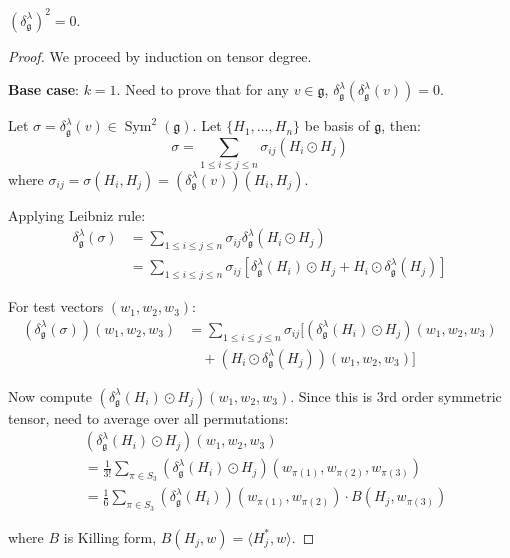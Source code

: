 \documentclass[10pt,a4paper]{amsart}
\begin{document}
\begin{theorem}[Nilpotency]
\label{thm:nilpotency}
$(\delta^\lambda_\mathfrak{g})^2 = 0$.
\end{theorem}

\begin{proof}
We proceed by induction on tensor degree.

\textbf{Base case}: $k=1$. Need to prove that for any $v \in \mathfrak{g}$, $\delta^\lambda_\mathfrak{g}(\delta^\lambda_\mathfrak{g}(v)) = 0$.

Let $\sigma = \delta^\lambda_\mathfrak{g}(v) \in \operatorname{Sym}^2(\mathfrak{g})$. Let $\{H_1, \ldots, H_n\}$ be basis of $\mathfrak{g}$, then:
$$\sigma = \sum_{1 \leq i \leq j \leq n} \sigma_{ij} (H_i \odot H_j)$$
where $\sigma_{ij} = \sigma(H_i, H_j) = (\delta^\lambda_\mathfrak{g}(v))(H_i, H_j)$.

Applying Leibniz rule:
\begin{align}
\delta^\lambda_\mathfrak{g}(\sigma) &= \sum_{1 \leq i \leq j \leq n} \sigma_{ij} \delta^\lambda_\mathfrak{g}(H_i \odot H_j) \\
&= \sum_{1 \leq i \leq j \leq n} \sigma_{ij} [\delta^\lambda_\mathfrak{g}(H_i) \odot H_j + H_i \odot \delta^\lambda_\mathfrak{g}(H_j)]
\end{align}

For test vectors $(w_1, w_2, w_3)$:
\begin{align}
(\delta^\lambda_\mathfrak{g}(\sigma))(w_1, w_2, w_3) &= \sum_{1 \leq i \leq j \leq n} \sigma_{ij} [(\delta^\lambda_\mathfrak{g}(H_i) \odot H_j)(w_1, w_2, w_3) \\
&\quad + (H_i \odot \delta^\lambda_\mathfrak{g}(H_j))(w_1, w_2, w_3)]
\end{align}

Now compute $(\delta^\lambda_\mathfrak{g}(H_i) \odot H_j)(w_1, w_2, w_3)$. Since this is 3rd order symmetric tensor, need to average over all permutations:
\begin{align}
&(\delta^\lambda_\mathfrak{g}(H_i) \odot H_j)(w_1, w_2, w_3) \\
&= \frac{1}{3!} \sum_{\pi \in S_3} (\delta^\lambda_\mathfrak{g}(H_i) \odot H_j)(w_{\pi(1)}, w_{\pi(2)}, w_{\pi(3)}) \\
&= \frac{1}{6} \sum_{\pi \in S_3} (\delta^\lambda_\mathfrak{g}(H_i))(w_{\pi(1)}, w_{\pi(2)}) \cdot B(H_j, w_{\pi(3)})
\end{align}

where $B$ is Killing form, $B(H_j, w) = \langle H_j^*, w \rangle$.


\end{proof}
\end{document}
